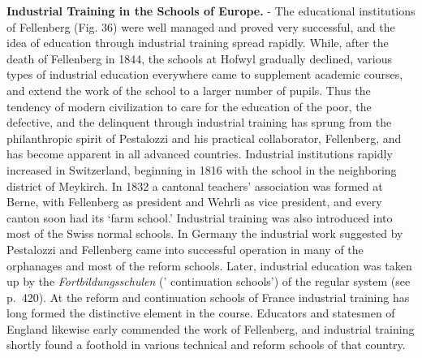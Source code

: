 \documentclass[
]{book}
\begin{document}
\textbf{Industrial Training in the Schools of Europe.} - The educational institutions of Fellenberg (Fig. 36) were well managed and proved very successful, and the idea of education through industrial training spread rapidly. While, after the death of Fellenberg in 1844, the schools at Hofwyl gradually declined, various types of industrial education everywhere came to supplement academic courses, and extend the work of the school to a larger number of pupils. Thus the tendency of modern civilization to care for the education of the poor, the defective, and the delinquent through industrial training has sprung from the philanthropic spirit of Pestalozzi and his practical collaborator, Fellenberg, and has become apparent in all advanced countries. Industrial institutions rapidly increased in Switzerland, beginning in 1816 with the school in the neighboring district of Meykirch. In 1832 a cantonal teachers' association was formed at Berne, with Fellenberg as president and Wehrli as vice president, and every canton soon had its `farm school.' Industrial training was also introduced into most of the Swiss normal schools. In Germany the industrial work suggested by Pestalozzi and Fellenberg came into successful operation in many of the orphanages and most of the reform schools. Later, industrial education was taken up by the \emph{Fortbildungsschulen} (' continuation schools') of the regular system (see p.~420). At the reform and continuation schools of France industrial training has long formed the distinctive element in the course. Educators and statesmen of England likewise early commended the work of Fellenberg, and industrial training shortly found a foothold in various technical and reform schools of that country.
\end{document}
